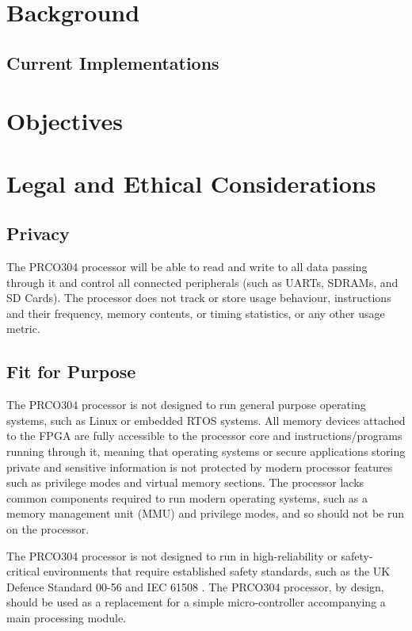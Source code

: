 \documentclass[11pt,a4paper]{report}
\newcommand{\scname}{PRCO304}
\begin{document}
\lipsum[0-5]

\section{Background}
\subsection{Current Implementations}

\section{Objectives}

\newpage
\section{Legal and Ethical Considerations}
\subsection{Privacy}
The \scname{} processor will be able to read and write to all data passing through it and control all connected peripherals (such as UARTs, SDRAMs, and SD Cards). The processor does not track or store usage behaviour, instructions and their frequency,   memory contents, or timing statistics, or any other usage metric.

\subsection{Fit for Purpose}
The \scname{} processor is not designed to run general purpose operating systems, such as Linux or embedded RTOS systems. All memory devices attached to the FPGA are fully accessible to the processor core and instructions/programs running through it, meaning that operating systems or secure applications storing private and sensitive information is not protected by modern processor features such as privilege modes and virtual memory sections. The processor lacks common components required to run modern operating systems, such as a memory management unit (MMU) and privilege modes, and so should not be run on the processor.

The \scname{} processor is not designed to run in high-reliability or safety-critical environments that require established safety standards, such as the UK Defence Standard 00-56 \citep{defstan_0056_2} and IEC 61508 \citep{iec61508}.
\newline\newline
The \scname{} processor, by design, should be used as a replacement for a simple micro-controller accompanying a main processing module.
\end{document}
